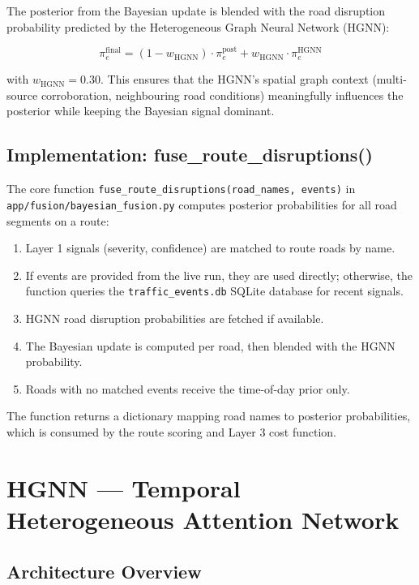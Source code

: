 \documentclass[12pt, a4paper]{report}
\begin{document}
The posterior from the Bayesian update is blended with the road disruption probability predicted by the Heterogeneous Graph Neural Network (HGNN):

\[
\pi_e^{\text{final}} = (1 - w_{\text{HGNN}}) \cdot \pi_e^{\text{post}} + w_{\text{HGNN}} \cdot \pi_e^{\text{HGNN}}
\]

with $w_{\text{HGNN}} = 0.30$. This ensures that the HGNN's spatial graph context (multi-source corroboration, neighbouring road conditions) meaningfully influences the posterior while keeping the Bayesian signal dominant.

\subsection{Implementation: fuse\_route\_disruptions()}

The core function \texttt{fuse\_route\_disruptions(road\_names, events)} in \texttt{app/fusion/bayesian\_fusion.py} computes posterior probabilities for all road segments on a route:

\begin{enumerate}
    \item Layer 1 signals (severity, confidence) are matched to route roads by name.
    \item If events are provided from the live run, they are used directly; otherwise, the function queries the \texttt{traffic\_events.db} SQLite database for recent signals.
    \item HGNN road disruption probabilities are fetched if available.
    \item The Bayesian update is computed per road, then blended with the HGNN probability.
    \item Roads with no matched events receive the time-of-day prior only.
\end{enumerate}

The function returns a dictionary mapping road names to posterior probabilities, which is consumed by the route scoring and Layer 3 cost function.

\section{HGNN — Temporal Heterogeneous Attention Network}

\subsection{Architecture Overview}
\end{document}
